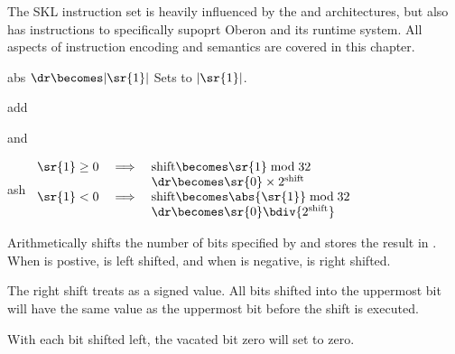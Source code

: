 
The SKL instruction set is heavily influenced by the \mips and
\natsemi architectures, but also has instructions to specifically
supoprt Oberon and its runtime system.  All aspects of instruction
encoding and semantics are covered in this chapter.


\begin{instruction}{abs}
     {\aaddopc}
     {$\dr \becomes |\sr{1}|$}
     {Sets \dr to $|\sr{1}|$.}
\end{instruction}


\begin{instruction}{add}
\end{instruction}


\begin{instruction}{and}
\end{instruction}


\begin{instruction}{ash}
     {
       \begin{math}
         \begin{array}{rcl}
           \sr{1} \geq 0 & \implies & \textrm{shift} \becomes \sr{1} \bmod 32        \\
              &          & \dr \becomes \sr{0} \times 2^\textrm{shift}   \\
           \sr{1} <    0 & \implies & \textrm{shift} \becomes \abs{\sr{1}} \bmod 32  \\
                         &          & \dr \becomes \sr{0} \bdiv {2^\textrm{shift}} \\
         \end{array}
       \end{math}
     }
     {
       Arithmetically shifts  the number of bits specified by
        and stores the result in \dr.  When  is postive,
        is left shifted, and when  is negative,  is
       right shifted.

       The right shift treats  as a signed value.  All bits
       shifted into the uppermost bit will have the same value as the
       uppermost bit before the shift is executed.

       With each bit shifted left, the vacated bit zero will set
       to zero.
     }
\end{instruction}


